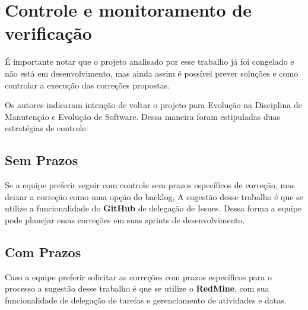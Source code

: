 \chapter{Controle e monitoramento de verificação}

É importante notar que o projeto analisado por esse trabalho já foi congelado 
e não está em desenvolvimento, mas ainda assim é possível prever soluções e 
como controlar a execução das correções propostas.

Os autores indicaram intenção de voltar o projeto para Evolução na Disciplina de 
Manutenção e Evolução de Software. Dessa maneira foram estipuladas duas estratégias 
de controle:

\section{Sem Prazos}

Se a equipe preferir seguir com controle sem prazos específicos de correção,
mas deixar a correção como uma opção do backlog, A sugestão desse trabalho é
que se utilize a funcionalidade do \textbf{GitHub} de delegação de Issues. Dessa forma
a equipe pode planejar essas correções em suas sprints de desenvolvimento.


\section{Com Prazos}

Caso a equipe preferir solicitar as correções com prazos específicos para o processo
a sugestão desse trabalho é que se utilize o \textbf{RedMine}, com sua funcionalidade
de delegação de tarefas e gerenciamento de atividades e datas.
